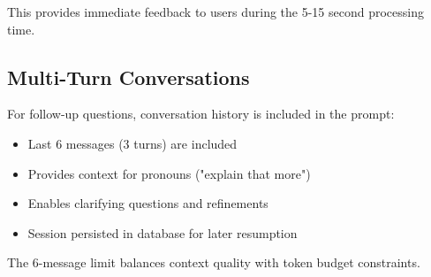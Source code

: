 This provides immediate feedback to users during the 5-15 second processing time.

\subsection{Multi-Turn Conversations}

For follow-up questions, conversation history is included in the prompt:

\begin{itemize}
    \item Last 6 messages (3 turns) are included
    \item Provides context for pronouns ("explain that more")
    \item Enables clarifying questions and refinements
    \item Session persisted in database for later resumption
\end{itemize}

The 6-message limit balances context quality with token budget constraints.

